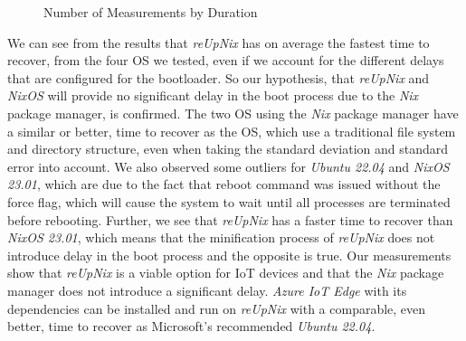 \begin{figure}[H]
\caption{Number of Measurements by Duration}
\label{fig:timetorecover}
\end{figure}
\noindent
We can see from the results that \textit{reUpNix} has on average the fastest time
to recover, from the four \ac{OS} we tested, even if we account for the different
delays that are configured for the bootloader. So our hypothesis, that \textit{reUpNix}
and \textit{NixOS} will provide no significant delay in the boot process due to
the \textit{Nix} package manager, is confirmed. The two \ac{OS} using the
\textit{Nix} package manager have a similar or better, time to recover as the \ac{OS},
which use a traditional file system and directory structure, even when taking
the standard deviation and standard error into account. We also observed some outliers
for \textit{Ubuntu 22.04} and \textit{NixOS 23.01}, which are due to the
fact that reboot command was issued without the force flag, which will cause
the system to wait until all processes are terminated before rebooting. Further,
we see that \textit{reUpNix} has a faster time to recover than \textit{NixOS 23.01},
which means that the minification process of \textit{reUpNix} does not introduce
delay in the boot process and the opposite is true.
Our measurements show that \textit{reUpNix} is a viable option for \ac{IoT} devices
and that the \textit{Nix} package manager does not introduce a significant delay.
\textit{Azure IoT Edge} with its dependencies can be installed and run on
\textit{reUpNix} with a comparable, even better, time to recover as Microsoft's
recommended \textit{Ubuntu 22.04}.


